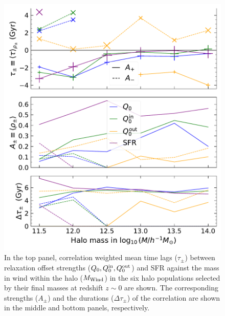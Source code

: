 \begin{figure}[htbp]
\centering
\includegraphics[width=.69\linewidth]{plots/dynam_relxn/shift_betw_multi-Wind_FoF_fullcorr.pdf}
\caption{In the top panel, correlation weighted mean time lags ($\tau_{\pm}$) between relaxation offset strengths ($Q_0, Q_0^{\rm{in}}, Q_0^{\rm{out}}$) and SFR against the mass in wind within the halo ($M_{\rm{Wind}}$) in the six halo populations selected by their final masses at redshift $z\sim 0$ are shown. The corresponding strengths ($A_{\pm}$) and the durations ($\Delta \tau_{\pm}$) of the correlation are shown in the middle and bottom panels, respectively.}
\label{fig:dynam-correl-q0-Mwind-timeshift-func}
\end{figure}



